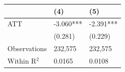 
\begin{tabular}{lll}
\toprule
  & (4) & (5)\\
\midrule
ATT & -3.060*** & -2.391***\\
 & (0.281) & (0.229)\\
Observations & 232,575 & 232,575\\
Within R$^2$ & 0.0165 & 0.0108\\
\bottomrule
\end{tabular}
